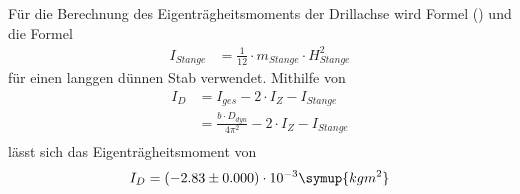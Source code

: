 Für die Berechnung des Eigenträgheitsmoments der Drillachse wird Formel () und die Formel
\begin{align}
I_{Stange} &= \frac{1}{12} \cdot m_{Stange} \cdot H_{Stange}^2
\end{align}
für einen langgen dünnen Stab verwendet. Mithilfe von
\begin{align}
  I_D        &= I_{ges} - 2 \cdot I_{Z} - I_{Stange}\\
             &= \frac{b \cdot D_{dyn}}{4 \pi^2} - 2 \cdot I_{Z} - I_{Stange}\\
\end{align}
lässt sich das Eigenträgheitsmoment von
\begin{equation}
  I_D = (-2.83 \pm 0.000)\cdot10^{-3} \symup{kg m^2}
\end{equation}
